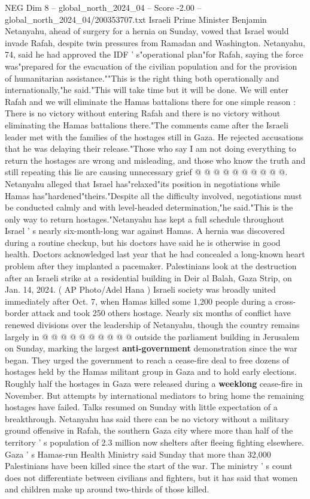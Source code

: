 \begin{textsample}{NEG Dim 8 – global\_north\_2024\_04 – Score -2.00 – global\_north\_2024\_04/200353707.txt}  \label{ex:f8_neg_131}
Israeli Prime Minister Benjamin Netanyahu, ahead of surgery for a hernia on Sunday, vowed that Israel would invade Rafah, despite twin pressures from Ramadan and Washington.
Netanyahu, 74, said he had approved the IDF ' s"operational plan"for Rafah, saying the force was"prepared for the evacuation of the civilian population and for the provision of humanitarian assistance.""This is the right thing both operationally and internationally,"he said."This will take time but it will be done.
We will enter Rafah and we will eliminate the Hamas battalions there for one simple reason : There is no victory without entering Rafah and there is no victory without eliminating the Hamas battalions there."The comments came after the Israeli leader met with the families of the hostages still in Gaza.
He rejected accusations that he was delaying their release."Those who say I am not doing everything to return the hostages are wrong and misleading, and those who know the truth and still repeating this lie are causing unnecessary grief @ @ @ @ @ @ @ @ @ @.
Netanyahu alleged that Israel has"relaxed"its position in negotiations while Hamas has"hardened"theirs."Despite all the difficulty involved, negotiations must be conducted calmly and with level-headed determination,"he said."This is the only way to return hostages."Netanyahu has kept a full schedule throughout Israel ' s nearly six-month-long war against Hamas.
A hernia was discovered during a routine checkup, but his doctors have said he is otherwise in good health.
Doctors acknowledged last year that he had concealed a long-known heart problem after they implanted a pacemaker.
Palestinians look at the destruction after an Israeli strike at a residential building in Deir al Balah, Gaza Strip, on Jan. 14, 2024. ( AP Photo/Adel Hana ) Israeli society was broadly united immediately after Oct. 7, when Hamas killed some 1,200 people during a cross-border attack and took 250 others hostage.
Nearly six months of conflict have renewed divisions over the leadership of Netanyahu, though the country remains largely in @ @ @ @ @ @ @ @ @ @ outside the parliament building in Jerusalem on Sunday, marking the largest \textbf{anti-government} demonstration since the war began.
They urged the government to reach a cease-fire deal to free dozens of hostages held by the Hamas militant group in Gaza and to hold early elections.
Roughly half the hostages in Gaza were released during a \textbf{weeklong} cease-fire in November.
But attempts by international mediators to bring home the remaining hostages have failed.
Talks resumed on Sunday with little expectation of a breakthrough.
Netanyahu has said there can be no victory without a military ground offensive in Rafah, the southern Gaza city where more than half of the territory ' s population of 2.3 million now shelters after fleeing fighting elsewhere.
Gaza ' s Hamas-run Health Ministry said Sunday that more than 32,000 Palestinians have been killed since the start of the war.
The ministry ' s count does not differentiate between civilians and fighters, but it has said that women and children make up around two-thirds of those killed.

\end{textsample}
